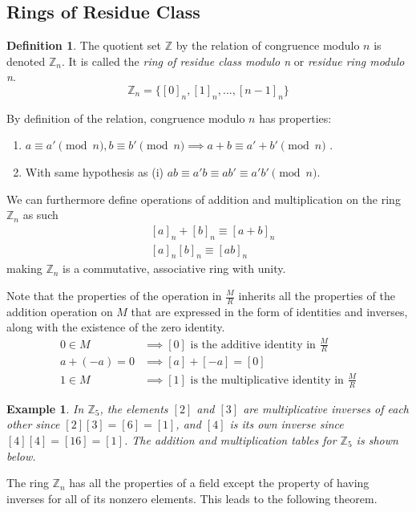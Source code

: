 \documentclass{article}
\newtheorem{example}{Example}[section]
\theoremstyle{remark}
\theoremstyle{definition}
\newtheorem{definition}{Definition}[section]
\begin{document}
\subsection{Rings of Residue Class}
\begin{definition}
The quotient set $\mathbb{Z}$ by the relation of congruence modulo $n$ is denoted $\mathbb{Z}_{n}$. It is called the \textit{ring of residue class modulo n} or \textit{residue ring modulo n}. 
\[ \mathbb{Z}_{n} = \{ [0]_{n}, [1]_{n}, ... , [n-1]_{n} \} \]
\end{definition}
By definition of the relation, congruence modulo $n$ has properties: 
\begin{enumerate}
    \item $a \equiv a' \pmod{n}, b \equiv b' \pmod{n} \implies a + b \equiv a' + b' \pmod{n}$ . 
    \item With same hypothesis as (i) $a b \equiv a' b \equiv a b' \equiv a' b' \pmod{n}$. 
\end{enumerate}
We can furthermore define operations of addition and multiplication on the ring $\mathbb{Z}_{n}$ as such 
\begin{align*}
    & [a]_{n} + [b]_{n} \equiv [a + b]_{n} \\
    & [a]_{n} [b]_{n} \equiv [ab]_{n}
\end{align*}
making $\mathbb{Z}_{n}$ is a commutative, associative ring with unity. 

Note that the properties of the operation in $\frac{M}{R}$ inherits all the properties of the addition operation on $M$ that are expressed in the form of identities and inverses, along with the existence of the zero identity. 
\begin{align*}
0 \in M & \implies [0] \text{ is the additive identity in } \frac{M}{R} \\
a + (-a) = 0 & \implies [a] + [-a] = [0] \\
1 \in M & \implies [1] \text{ is the multiplicative identity in } \frac{M}{R}
\end{align*}

\begin{example}
In $\mathbb{Z}_{5}$, the elements $[2]$ and $[3]$ are multiplicative inverses of each other since $[2] [3] = [6] = [1]$, and $[4]$ is its own inverse since $[4] [4] = [16] = [1]$. The addition and multiplication tables for $\mathbb{Z}_5$ is shown below. 
\end{example}

The ring $\mathbb{Z}_n$ has all the properties of a field except the property of having inverses for all of its nonzero elements. This leads to the following theorem. 
\end{document}

